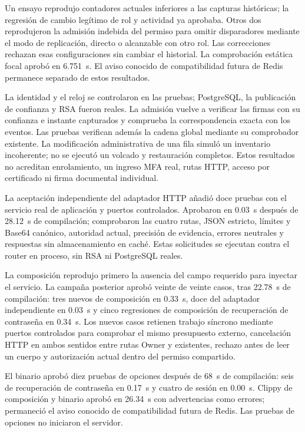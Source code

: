Un ensayo reprodujo contadores actuales inferiores a las capturas históricas;
la regresión de cambio legítimo de rol y actividad ya aprobaba. Otros dos
reprodujeron la admisión indebida del permiso para omitir disparadores mediante
el modo de replicación, directo o alcanzable con otro rol. Las correcciones
rechazan esas configuraciones sin cambiar el historial. La comprobación estática
focal aprobó en 6.751~s. El aviso conocido de compatibilidad futura de Redis
permanece separado de estos resultados.

La identidad y el reloj se controlaron en las pruebas; PostgreSQL, la publicación
de confianza y RSA fueron reales. La admisión vuelve a verificar las firmas con
su confianza e instante capturados y comprueba la correspondencia exacta con
los eventos. Las pruebas verifican además la cadena global mediante su
comprobador existente. La modificación administrativa de una fila simuló un
inventario incoherente; no se ejecutó un volcado y restauración completos. Estos
resultados no acreditan enrolamiento, un ingreso MFA real, rutas HTTP, acceso por
certificado ni firma documental individual.

La aceptación independiente del adaptador HTTP añadió doce pruebas con el
servicio real de aplicación y puertos controlados. Aprobaron en 0.03~s después
de 28.12~s de compilación; comprobaron las cuatro rutas, JSON estricto, límites
y Base64 canónico, autoridad actual, precisión de evidencia, errores neutrales
y respuestas sin almacenamiento en caché. Estas solicitudes se ejecutan contra
el router en proceso, sin RSA ni PostgreSQL reales.

La composición reprodujo primero la ausencia del campo requerido para inyectar
el servicio. La campaña posterior aprobó veinte de veinte casos, tras 22.78~s
de compilación: tres nuevos de composición en 0.33~s, doce del adaptador
independiente en 0.03~s y cinco regresiones de composición de recuperación de
contraseña en 0.34~s. Los nuevos casos retienen trabajo síncrono mediante puertos
controlados para comprobar el mismo presupuesto externo, cancelación HTTP en
ambos sentidos entre rutas Owner y existentes, rechazo antes de leer un cuerpo
y autorización actual dentro del permiso compartido.

El binario aprobó diez pruebas de opciones después de 68~s de compilación:
seis de recuperación de contraseña en 0.17~s y cuatro de sesión en 0.00~s.
Clippy de composición y binario aprobó en 26.34~s con advertencias como errores;
permaneció el aviso conocido de compatibilidad futura de Redis. Las pruebas de
opciones no iniciaron el servidor.

